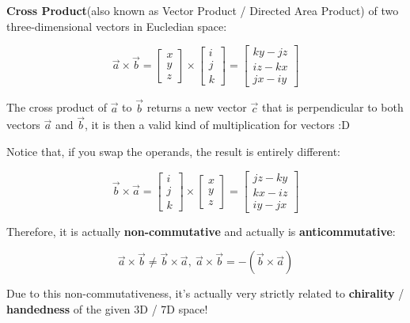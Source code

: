 \sgap
\textbf{Cross Product}(also known as Vector Product / Directed Area Product) of two three-dimensional vectors in Eucledian space:
\begin{center}
    \[
        {\vec{a}} \times {\vec{b}}=\begin{bmatrix}x \\ y \\ z\end{bmatrix} \times \begin{bmatrix}i \\ j \\ k\end{bmatrix}=\begin{bmatrix}ky - jz \\ iz - kx \\ jx - iy\end{bmatrix}
    \]
\end{center}

The cross product of $\vec{a}$ to $\vec{b}$ returns a new vector $\vec{c}$ that is perpendicular to both vectors $\vec{a}$ and $\vec{b}$, it is
then a valid kind of multiplication for vectors :D

\sgap
\begin{samepage}
    Notice that, if you swap the operands, the result is entirely different:
    \begin{center}
        \[
            {\vec{b}} \times {\vec{a}}=\begin{bmatrix}i \\ j \\ k\end{bmatrix} \times \begin{bmatrix}x \\ y \\ z\end{bmatrix}=\begin{bmatrix}jz - ky \\ kx - iz \\ iy - jx\end{bmatrix}
        \]
    \end{center}
\end{samepage}

\begin{samepage}
    Therefore, it is actually \textbf{non-commutative} and actually is \textbf{anticommutative}:
    \begin{center}
        \[
            {\vec{a}} \times {\vec{b}} \neq {\vec{b}} \times {\vec{a}},~{\vec{a}} \times {\vec{b}}=-(\vec{b} \times \vec{a})
        \]
    \end{center}

    Due to this non-commutativeness, it's actually very strictly related to \textbf{chirality} / \textbf{handedness} of the given 3D / 7D space!
\end{samepage}

